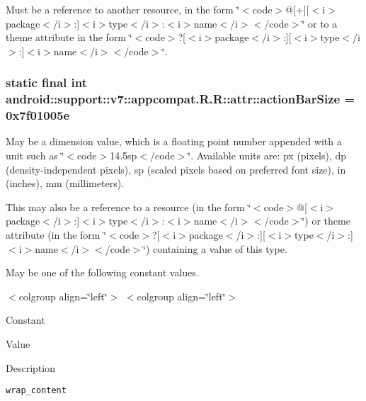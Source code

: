 Must be a reference to another resource, in the form \char`\"{}$<$code$>$@\mbox{[}+\mbox{]}\mbox{[}$<$i$>$package$<$/i$>$:\mbox{]}$<$i$>$type$<$/i$>$:$<$i$>$name$<$/i$>$$<$/code$>$\char`\"{} or to a theme attribute in the form \char`\"{}$<$code$>$?\mbox{[}$<$i$>$package$<$/i$>$:\mbox{]}\mbox{[}$<$i$>$type$<$/i$>$:\mbox{]}$<$i$>$name$<$/i$>$$<$/code$>$\char`\"{}. \hypertarget{classandroid_1_1support_1_1v7_1_1appcompat_1_1_r_1_1attr_4575ded4c31b964c573874acfc8f6499}{
\subsubsection[{actionBarSize}]{\setlength{\rightskip}{0pt plus 5cm}static final int android::support::v7::appcompat.R.R::attr::actionBarSize = 0x7f01005e}}
\label{classandroid_1_1support_1_1v7_1_1appcompat_1_1_r_1_1attr_4575ded4c31b964c573874acfc8f6499}


May be a dimension value, which is a floating point number appended with a unit such as \char`\"{}$<$code$>$14.5sp$<$/code$>$\char`\"{}. Available units are: px (pixels), dp (density-independent pixels), sp (scaled pixels based on preferred font size), in (inches), mm (millimeters). 

This may also be a reference to a resource (in the form \char`\"{}$<$code$>$@\mbox{[}$<$i$>$package$<$/i$>$:\mbox{]}$<$i$>$type$<$/i$>$:$<$i$>$name$<$/i$>$$<$/code$>$\char`\"{}) or theme attribute (in the form \char`\"{}$<$code$>$?\mbox{[}$<$i$>$package$<$/i$>$:\mbox{]}\mbox{[}$<$i$>$type$<$/i$>$:\mbox{]}$<$i$>$name$<$/i$>$$<$/code$>$\char`\"{}) containing a value of this type. 

May be one of the following constant values. \begin{TabularC}{0}
\hline
\end{TabularC}
$<$colgroup align=\char`\"{}left\char`\"{}$>$ $<$colgroup align=\char`\"{}left\char`\"{}$>$ 

Constant

Value

Description 

{\tt wrap\_\-content}

